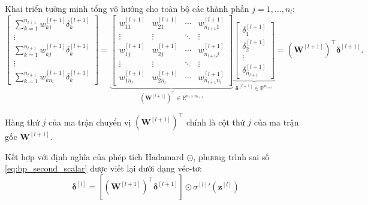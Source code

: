 Khai triển tường minh tổng vô hướng cho toàn bộ các thành phần $j = 1, \dots, n_l$:
\begin{equation}
\begin{bmatrix}
\displaystyle\sum_{k=1}^{n_{l+1}} w_{k1}^{[l+1]} \delta_k^{[l+1]} \\[10pt]
\vdots \\[4pt]
\displaystyle\sum_{k=1}^{n_{l+1}} w_{kj}^{[l+1]} \delta_k^{[l+1]} \\[10pt]
\vdots \\[4pt]
\displaystyle\sum_{k=1}^{n_{l+1}} w_{k n_l}^{[l+1]} \delta_k^{[l+1]}
\end{bmatrix}
=
\underbrace{
\begin{bmatrix}
w_{11}^{[l+1]} & w_{21}^{[l+1]} & \cdots & w_{n_{l+1} 1}^{[l+1]} \\
\vdots & \vdots & \ddots & \vdots \\
w_{1j}^{[l+1]} & w_{2j}^{[l+1]} & \cdots & w_{n_{l+1} j}^{[l+1]} \\
\vdots & \vdots & \ddots & \vdots \\
w_{1 n_l}^{[l+1]} & w_{2 n_l}^{[l+1]} & \cdots & w_{n_{l+1} n_l}^{[l+1]}
\end{bmatrix}
}_{\left(\mathbf{W}^{[l+1]}\right)^\top \in \mathbb{R}^{n_l \times n_{l+1}}}
\underbrace{
\begin{bmatrix}
\delta_1^{[l+1]} \\
\delta_2^{[l+1]} \\
\vdots \\
\delta_{n_{l+1}}^{[l+1]}
\end{bmatrix}
}_{\boldsymbol{\delta}^{[l+1]} \in \mathbb{R}^{n_{l+1}}}
=
\left(\mathbf{W}^{[l+1]}\right)^\top \boldsymbol{\delta}^{[l+1]}.
\end{equation}

\begin{remark}
    Hàng thứ $j$ của ma trận chuyển vị $\left(\mathbf{W}^{[l+1]}\right)^\top$ chính là cột thứ $j$ của ma trận gốc $\mathbf{W}^{[l+1]}$.
\end{remark}

Kết hợp với định nghĩa của phép tích Hadamard $\odot$, phương trình sai số \eqref{eq:bp_second_scalar} được viết lại dưới dạng véc-tơ:
\begin{equation}
\boxed{
\boldsymbol{\delta}^{[l]} = \left[ \left(\mathbf{W}^{[l+1]}\right)^\top \boldsymbol{\delta}^{[l+1]} \right] \odot {\sigma^{[l]}}'\!\left(\mathbf{z}^{[l]}\right)}
\label{eq:bp_second_vector}
\end{equation}

